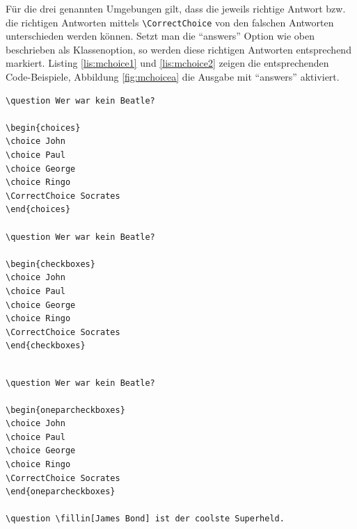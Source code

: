 Für die drei genannten Umgebungen gilt, dass die jeweils richtige Antwort bzw. die richtigen Antworten mittels \texttt{\textbackslash CorrectChoice} von den falschen Antworten unterschieden werden können. 
Setzt man die \enquote{answers} Option wie oben beschrieben als Klassenoption, so werden diese richtigen Antworten entsprechend markiert. 
Listing \ref{lis:mchoice1} und \ref{lis:mchoice2} zeigen die entsprechenden Code-Beispiele, Abbildung \ref{fig:mchoicea} die Ausgabe mit \enquote{answers} aktiviert.

\begin{lstlisting}[caption={Multiple-Choice Aufgaben 1},label={lis:mchoice1}]
\question Wer war kein Beatle?

\begin{choices}
\choice John
\choice Paul
\choice George
\choice Ringo
\CorrectChoice Socrates
\end{choices}

\question Wer war kein Beatle?

\begin{checkboxes}
\choice John
\choice Paul
\choice George
\choice Ringo
\CorrectChoice Socrates
\end{checkboxes}
\end{lstlisting}

\clearpage

\begin{lstlisting}[caption={Multiple-Choice Aufgaben 2},label={lis:mchoice2}]

\question Wer war kein Beatle?

\begin{oneparcheckboxes}
\choice John
\choice Paul
\choice George
\choice Ringo
\CorrectChoice Socrates
\end{oneparcheckboxes}

\question \fillin[James Bond] ist der coolste Superheld.

\end{lstlisting}

